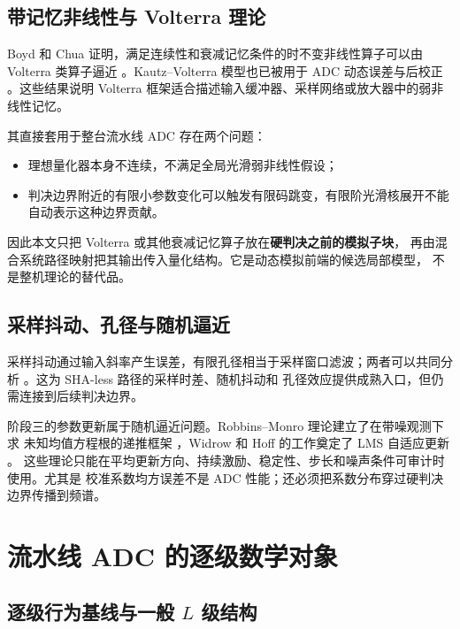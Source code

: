 \documentclass[11pt,a4paper]{ctexart}
\theoremstyle{adcplain}
\theoremstyle{definition}
\begin{document}
\subsection{带记忆非线性与 Volterra 理论}

Boyd 和 Chua 证明，满足连续性和衰减记忆条件的时不变非线性算子可以由 Volterra
类算子逼近 \cite{Boyd1985FadingMemory}。Kautz--Volterra 模型也已被用于 ADC
动态误差与后校正 \cite{Bjorsell2010KautzVolterraADC}。这些结果说明 Volterra
框架适合描述输入缓冲器、采样网络或放大器中的弱非线性记忆。

其直接套用于整台流水线 ADC 存在两个问题：

\begin{itemize}
  \item 理想量化器本身不连续，不满足全局光滑弱非线性假设；
  \item 判决边界附近的有限小参数变化可以触发有限码跳变，有限阶光滑核展开不能
        自动表示这种边界贡献。
\end{itemize}

因此本文只把 Volterra 或其他衰减记忆算子放在\textbf{硬判决之前的模拟子块}，
再由混合系统路径映射把其输出传入量化结构。它是动态模拟前端的候选局部模型，
不是整机理论的替代品。

\subsection{采样抖动、孔径与随机逼近}

采样抖动通过输入斜率产生误差，有限孔径相当于采样窗口滤波；两者可以共同分析
\cite{Kobayashi2002JitterAperture}。这为 SHA-less 路径的采样时差、随机抖动和
孔径效应提供成熟入口，但仍需连接到后续判决边界。

阶段三的参数更新属于随机逼近问题。Robbins--Monro 理论建立了在带噪观测下求
未知均值方程根的递推框架 \cite{Robbins1951StochasticApproximation}，Widrow
和 Hoff 的工作奠定了 LMS 自适应更新 \cite{Widrow1960AdaptiveSwitching}。
这些理论只能在平均更新方向、持续激励、稳定性、步长和噪声条件可审计时使用。尤其是
校准系数均方误差不是 ADC 性能；还必须把系数分布穿过硬判决边界传播到频谱。

\section{流水线 ADC 的逐级数学对象}

\subsection{\texorpdfstring{逐级行为基线与一般 $L$ 级结构}{逐级行为基线与一般 L 级结构}}
\end{document}
